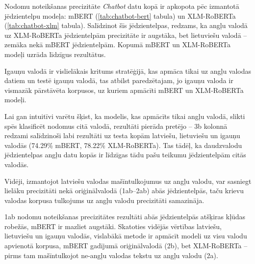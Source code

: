 Nodomu noteikšanas precizitāte \textit{Chatbot} datu kopā ir apkopota pēc izmantotā jēdzientelpu modeļa: mBERT (\ref{tab:chatbot-bert} tabula) un XLM-RoBERTa (\ref{tab:chatbot-xlm} tabula). Salīdzinot šīs jēdzientelpas, redzams, ka angļu valodā uz XLM-RoBERTa jēdzientelpām precizitāte ir augstāka, bet lietuviešu valodā -- zemāka nekā mBERT jēdzientelpām. Kopumā mBERT un XLM-RoBERTa modeļi uzrāda līdzīgus rezultātus.


Igauņu valodā ir vislielākais kritums stratēģijā, kas apmāca tikai uz angļu valodas datiem un testē igauņu valodā, tas atbilst paredzētajam, jo igauņu valoda ir vismazāk pārstāvēta korpusos, uz kuriem apmācīti mBERT un XLM-RoBERTa modeļi.

Lai gan intuitīvi varētu šķist, ka modelis, kas apmācīts tikai angļu valodā, slikti spēs klasificēt nodomus citā valodā, rezultāti pierāda pretējo -- 3b kolonnā redzami salīdzinoši labi rezultāti uz testa kopām latviešu, lietuviešu un igauņu valodās (74.29\% mBERT, 78.22\% XLM-RoBERTa). Tas tādēļ, ka daudzvalodu jēdzientelpas angļu datu kopās ir līdzīgas tādu pašu teikumu jēdzientelpām citās valodās. 




Vidēji, izmantojot latviešu valodas mašīntulkojumus uz angļu valodu, var sasniegt lielāku precizitāti nekā oriģinālvalodā (1ab--2ab) abās jēdzientelpās, taču krievu valodas korpusa tulkojums uz angļu valodu precizitāti samazināja. 


1ab nodomu noteikšanas precizitātes rezultāti abās jēdzientelpās atšķiras kļūdas robežās, mBERT ir mazliet augstāki. Skatoties vidējās vērtības latviešu, lietuviešu un igauņu valodās, vislabākā metode ir apmācīt modeli uz visu valodu apvienotā korpusa, mBERT gadījumā oriģinālvalodā (2b), bet XLM-RoBERTa -- pirms tam mašīntulkojot ne-angļu valodas tekstu uz angļu valodu (2a).



